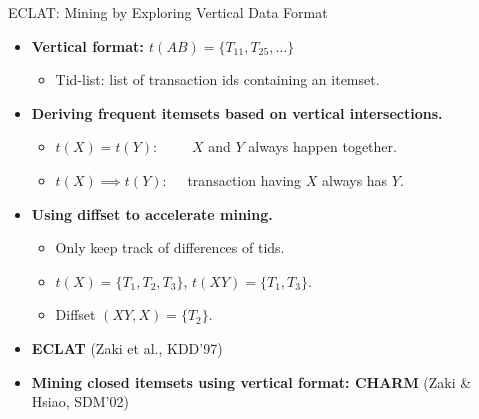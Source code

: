 \begin{frame}{ECLAT: Mining by Exploring Vertical Data Format}
	\begin{itemize}
		\item \textbf{Vertical format: $t(AB) = \{T_{11},T_{25},\ldots\}$}
		      \begin{itemize}
			      \item Tid-list: list of transaction ids containing an itemset.
		      \end{itemize}
		\item \textbf{Deriving frequent itemsets based on vertical
			      intersections.}
		      \begin{itemize}
			      \item $t(X) = t(Y): \qquad$ \hphantom{.} $X$ and $Y$ always happen
			            together.
			      \item $t(X) \implies t(Y):\quad $ transaction having $X$ always has
			            $Y$.
		      \end{itemize}
		\item \textbf{Using diffset to accelerate mining.}
		      \begin{itemize}
			      \item Only keep track of differences of tids.
			      \item $t(X) = \{T_1,T_2,T_3\}$, $t(XY) = \{T_1,T_3\}$.
			      \item Diffset $(XY,X) = \{T_2\}$.
		      \end{itemize}
		\item \textbf{ECLAT} (Zaki et al., KDD'97)
		\item \textbf{Mining closed itemsets using vertical format: CHARM}
		      (Zaki \& Hsiao, SDM'02)
	\end{itemize}
\end{frame}

